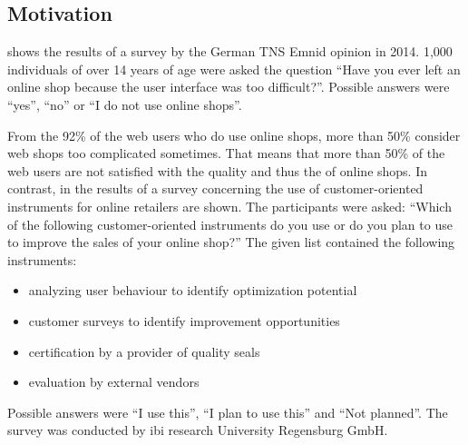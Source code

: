 \documentclass[output=paper]{langsci/langscibook}
\begin{document}
\subsection{Motivation}

 shows the results of a survey by the German TNS Emnid opinion in 2014. 1,000 individuals of over 14 years of age were asked the question ``Have you ever left an online shop because the user interface was too difficult?''. Possible answers were ``yes'', ``no'' or ``I do not use online shops''.


From the 92\% of the web users who do use online shops, more than 50\% consider web shops too complicated sometimes. That means that more than 50\% of the web users are not satisfied with the quality and thus the  of online shops. In contrast, in  the results of a survey concerning the use of customer-oriented instruments for online retailers are shown. The participants were asked: ``Which of the following customer-oriented instruments do you use or do you plan to use to improve the sales of your online shop?'' The given list contained the following instruments:

\largerpage
\begin{itemize}
\item analyzing user behaviour to identify optimization potential 
\item customer surveys to identify improvement opportunities 
\item certification by a provider of quality seals 
\item {} evaluation by external vendors 
\end{itemize}

Possible answers were ``I use this'', ``I plan to use this'' and ``Not planned''. The survey was conducted by ibi research University Regensburg GmbH. 
\end{document}
